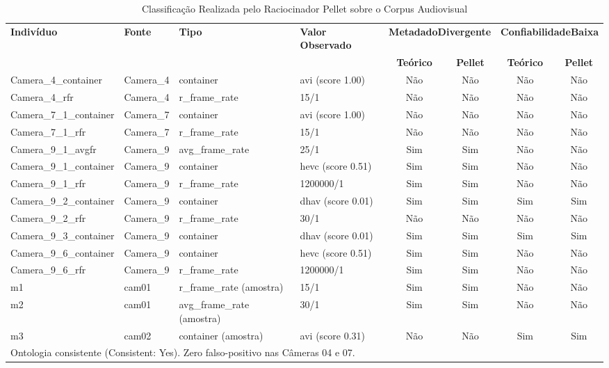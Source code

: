 \begin{table}[t]
\centering
\small
\caption{Classificação Realizada pelo Raciocinador Pellet sobre o Corpus Audiovisual}
\label{tab:validacao-pellet}
\begin{tabular}{llllcccc}
\hline
\textbf{Indivíduo} & \textbf{Fonte} & \textbf{Tipo} & \textbf{Valor Observado} & \multicolumn{2}{c}{\textbf{MetadadoDivergente}} & \multicolumn{2}{c}{\textbf{ConfiabilidadeBaixa}} \\
 & & & & \textbf{Teórico} & \textbf{Pellet} & \textbf{Teórico} & \textbf{Pellet} \\
\hline
Camera\_4\_container & Camera\_4 & container & avi (score 1.00) & Não & Não & Não & Não \\
Camera\_4\_rfr & Camera\_4 & r\_frame\_rate & 15/1 & Não & Não & Não & Não \\
Camera\_7\_1\_container & Camera\_7 & container & avi (score 1.00) & Não & Não & Não & Não \\
Camera\_7\_1\_rfr & Camera\_7 & r\_frame\_rate & 15/1 & Não & Não & Não & Não \\
Camera\_9\_1\_avgfr & Camera\_9 & avg\_frame\_rate & 25/1 & Sim & Sim & Não & Não \\
Camera\_9\_1\_container & Camera\_9 & container & hevc (score 0.51) & Sim & Sim & Não & Não \\
Camera\_9\_1\_rfr & Camera\_9 & r\_frame\_rate & 1200000/1 & Sim & Sim & Não & Não \\
Camera\_9\_2\_container & Camera\_9 & container & dhav (score 0.01) & Sim & Sim & Sim & Sim \\
Camera\_9\_2\_rfr & Camera\_9 & r\_frame\_rate & 30/1 & Não & Não & Não & Não \\
Camera\_9\_3\_container & Camera\_9 & container & dhav (score 0.01) & Sim & Sim & Sim & Sim \\
Camera\_9\_6\_container & Camera\_9 & container & hevc (score 0.51) & Sim & Sim & Não & Não \\
Camera\_9\_6\_rfr & Camera\_9 & r\_frame\_rate & 1200000/1 & Sim & Sim & Não & Não \\
m1 & cam01 & r\_frame\_rate (amostra) & 15/1 & Sim & Sim & Não & Não \\
m2 & cam01 & avg\_frame\_rate (amostra) & 30/1 & Sim & Sim & Não & Não \\
m3 & cam02 & container (amostra) & avi (score 0.31) & Não & Não & Sim & Sim \\
\hline
\multicolumn{8}{l}{\footnotesize Ontologia consistente (Consistent: Yes). Zero falso-positivo nas Câmeras 04 e 07.} \\
\hline
\end{tabular}
\end{table}